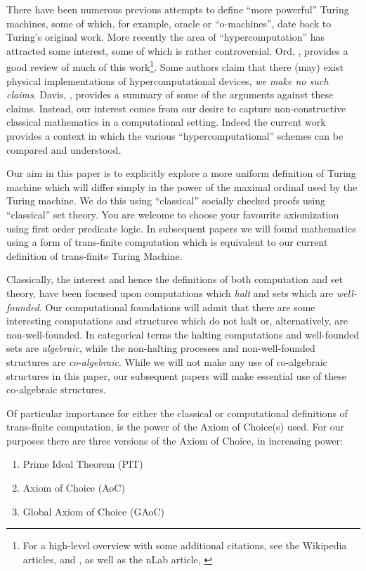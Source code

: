 \documentclass[a4paper]{amsart}
\begin{document}
There have been numerous previous attempts to define ``more powerful'' Turing machines,
some of which, for example, oracle or ``o-machines'', date back to Turing's original work.
More recently the area of ``hypercomputation'' has attracted some interest, some of which
is rather controversial. Ord, \cite{ord2006hyperComputation}, provides a good review of
much of this work\footnote{For a high-level overview with some additional citations, see
the Wikipedia articles, \cite{wikipedia2015hyperComputation} and
\cite{wikipedia2015superRecursiveAlgorithm}, as well as the nLab article,
\cite{nLab2015hyperComputation}}. Some authors claim that there (may) exist physical
implementations of hypercomputational devices, \emph{we make \emph{no} such claims}.
Davis, \cite{davis2004hyperComputation}, provides a summary of some of the arguments
against these claims. Instead, our interest comes from our desire to capture
non-constructive classical mathematics in a computational setting. Indeed the current work
provides a context in which the various ``hypercomputational'' schemes can be compared and
understood.


Our aim in this paper is to explicitly explore a more uniform definition of Turing machine
which will differ simply in the power of the maximal ordinal used by the Turing machine.
We do this using ``classical'' socially checked proofs using ``classical'' set theory. You
are welcome to choose your favourite axiomization using first order predicate logic. In
subsequent papers we will found mathematics using a form of trans-finite computation which
is equivalent to our current definition of trans-finite Turing Machine. 

Classically, the interest and hence the definitions of both computation and set theory,
have been focused upon computations which \emph{halt} and sets which are
\emph{well-founded}. Our computational foundations will admit that there are some
interesting computations and structures which do not halt or, alternatively, are
non-well-founded. In categorical terms the halting computations and well-founded sets are
\emph{algebraic}, while the non-halting processes and non-well-founded structures are
\emph{co-algebraic}. While we will not make any use of co-algebraic structures in this
paper, our subsequent papers will make essential use of these co-algebraic structures.

Of particular importance for either the classical or computational definitions of
trans-finite computation, is the power of the Axiom of Choice(s) used. For our purposes
there are three versions of the Axiom of Choice, in increasing power:
%
\begin{enumerate}
\item Prime Ideal Theorem (PIT)
\item Axiom of Choice (AoC)
\item Global Axiom of Choice (GAoC)
\end{enumerate}
\end{document}
